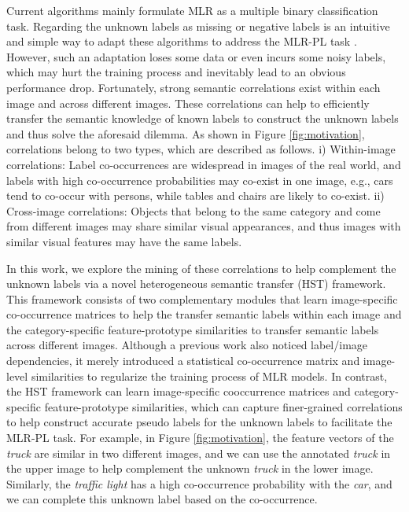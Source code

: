 Current algorithms mainly formulate MLR as a multiple binary classification task. Regarding the unknown labels as missing or negative labels is an intuitive and simple way to adapt these algorithms to address the MLR-PL task \cite{sun2017revisiting,joulin2016learning}. However, such an adaptation loses some data or even incurs some noisy labels, which may hurt the training process and inevitably lead to an obvious performance drop. Fortunately, strong semantic correlations exist within each image and across different images. These correlations can help to efficiently transfer the semantic knowledge of known labels to construct the unknown labels and thus solve the aforesaid dilemma. As shown in Figure \ref{fig:motivation}, correlations belong to two types, which are described as follows. i) Within-image correlations: Label co-occurrences are widespread in images of the real world, and labels with high co-occurrence probabilities may co-exist in one image, e.g., cars tend to co-occur with persons, while tables and chairs are likely to co-exist. ii) Cross-image correlations: Objects that belong to the same category and come from different images may share similar visual appearances, and thus images with similar visual features may have the same labels.

In this work, we explore the mining of these correlations to help complement the unknown labels via a novel heterogeneous semantic transfer (HST) framework. This framework consists of two complementary modules that learn image-specific co-occurrence matrices to help the transfer semantic labels within each image and the category-specific feature-prototype similarities to transfer semantic labels across different images. Although a previous work \cite{huynh2020interactive} also noticed label/image dependencies, it merely introduced a statistical co-occurrence matrix and image-level similarities to regularize the training process of MLR models. In contrast, the HST framework can learn image-specific cooccurrence matrices and category-specific feature-prototype similarities, which can capture finer-grained correlations to help construct accurate pseudo labels for the unknown labels to facilitate the MLR-PL task. For example, in Figure \ref{fig:motivation}, the feature vectors of the \emph{truck} are similar in two different images, and we can use the annotated \emph{truck} in the upper image to help complement the unknown \emph{truck} in the lower image. Similarly, the \emph{traffic light} has a high co-occurrence probability with the \emph{car}, and we can complete this unknown label based on the co-occurrence.

